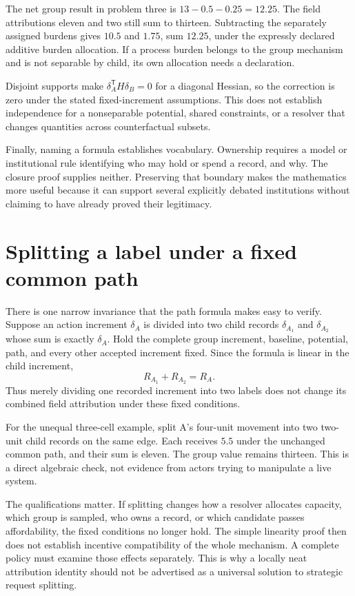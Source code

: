 The net group result in problem three is \(13-0.5-0.25=12.25\). The field attributions eleven and two still sum to thirteen. Subtracting the separately assigned burdens gives \(10.5\) and \(1.75\), sum \(12.25\), under the expressly declared additive burden allocation. If a process burden belongs to the group mechanism and is not separable by child, its own allocation needs a declaration.

Disjoint supports make \(\delta_A^{\mathsf T}H\delta_B=0\) for a diagonal Hessian, so the correction is zero under the stated fixed-increment assumptions. This does not establish independence for a nonseparable potential, shared constraints, or a resolver that changes quantities across counterfactual subsets.

Finally, naming a formula establishes vocabulary. Ownership requires a model or institutional rule identifying who may hold or spend a record, and why. The closure proof supplies neither. Preserving that boundary makes the mathematics more useful because it can support several explicitly debated institutions without claiming to have already proved their legitimacy.

\section{Splitting a label under a fixed common path}

There is one narrow invariance that the path formula makes easy to verify. Suppose an action increment \(\delta_A\) is divided into two child records \(\delta_{A_1}\) and \(\delta_{A_2}\) whose sum is exactly \(\delta_A\). Hold the complete group increment, baseline, potential, path, and every other accepted increment fixed. Since the formula is linear in the child increment,
\begin{equation}
R_{A_1}+R_{A_2}=R_A.
\end{equation}
Thus merely dividing one recorded increment into two labels does not change its combined field attribution under these fixed conditions.

For the unequal three-cell example, split A's four-unit movement into two two-unit child records on the same edge. Each receives \(5.5\) under the unchanged common path, and their sum is eleven. The group value remains thirteen. This is a direct algebraic check, not evidence from actors trying to manipulate a live system.

The qualifications matter. If splitting changes how a resolver allocates capacity, which group is sampled, who owns a record, or which candidate passes affordability, the fixed conditions no longer hold. The simple linearity proof then does not establish incentive compatibility of the whole mechanism. A complete policy must examine those effects separately. This is why a locally neat attribution identity should not be advertised as a universal solution to strategic request splitting.

